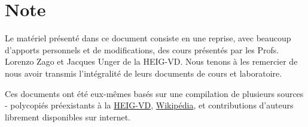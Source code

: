 \chapter*{Note}

Le matériel présenté dans ce document consiste en une reprise, avec beaucoup d'apports personnels et de modifications, des cours présentés par les Profs. Lorenzo Zago et Jacques Unger de la HEIG-VD. Nous tenons à les remercier de nous avoir transmis l'intégralité de leurs documents de cours et laboratoire.

Ces documents ont été eux-mêmes basés sur une compilation de plusieurs sources - polycopiés préexistants à la \href{http://www.heig-vd.ch}{HEIG-VD}, \href{http://wikipedia.org}{Wikipédia}, et contributions d'auteurs librement disponibles sur internet.
